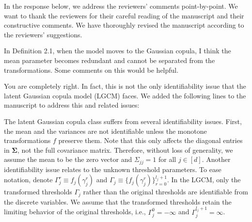 In the response below, we address the reviewers' comments point-by-point. We want to thank the reviewers for their careful reading of the manuscript and their constructive comments. We have thoroughly revised the manuscript according to the reviewers' suggestions.

\reviewersection


\begin{point}
    In Definition 2.1, when the model moves to the Gaussian copula, I think the mean parameter becomes redundant and cannot be separated from the transformations. Some comments on this would be helpful.
\end{point}

\begin{reply}
    You are completely right. In fact, this is not the only identifiability issue that the latent Gaussian copula model (LGCM) faces. We added the following lines to the manuscript to address this and related issues:
\end{reply}


\begin{change}
    The latent Gaussian copula class suffers from several identifiability issues. First, the mean and the variances are not identifiable unless the monotone transformations \(f\) preserve them. Note that this only affects the diagonal entries in \(\mathbf\Sigma\), not the full covariance matrix. Therefore, without loss of generality, we assume the mean to be the zero vector and \(\Sigma_{jj} = 1\) for all \(j \in [d]\). Another identifiability issue relates to the unknown threshold parameters. To ease notation, denote \(\Gamma_j^r \equiv f_j(\gamma_j^r)\) and \(\Gamma_j \equiv \{f_j(\gamma_j^r)\}_{r=0}^{l_j+1}\). In the LGCM, only the transformed thresholds \(\Gamma_j\) rather than the original thresholds are identifiable from the discrete variables. We assume that the transformed thresholds retain the limiting behavior of the original thresholds, i.e., \(\Gamma_{j}^{0} = -\infty\) and \(\Gamma_j^{l_j+1} = \infty\).
\end{change}


